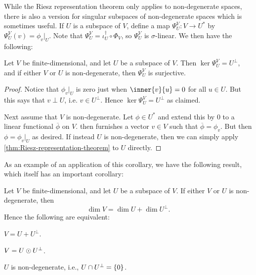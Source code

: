 While the Riesz representation theorem only applies to non-degenerate spaces, there is also a version for singular subspaces of non-degenerate spaces which is sometimes useful. If $U$ is a subspace of $V$, define a map $\Psi^V_U \colon V \to U^*$ by $\Psi^V_U(v) = \phi_v|_U$. Note that $\Psi^V_U = \iota_U^\dagger \circ \Phi_V$, so $\Psi^V_U$ is $\sigma$-linear. We then have the following:

\begin{corollary}
    \label{thm:Riesz-representation-theorem-for-subspaces}
    Let $V$ be finite-dimensional, and let $U$ be a subspace of $V$. Then $\ker \Psi^V_U = U^\perp$, and if either $V$ or $U$ is non-degenerate, then $\Psi^V_U$ is surjective.
\end{corollary}

\begin{proof}
    Notice that $\phi_v|_U$ is zero just when $\inner{v}{u} = 0$ for all $u \in U$. But this says that $v \perp U$, i.e. $v \in U^\perp$. Hence $\ker \Psi^V_U = U^\perp$ as claimed.
    
    Next assume that $V$ is non-degenerate. Let $\phi \in U^*$ and extend this by $0$ to a linear functional $\overline{\phi}$ on $V$.  then furnishes a vector $v \in V$ such that $\overline{\phi} = \phi_v$. But then $\phi = \phi_v|_U$ as desired. If instead $U$ is non-degenerate, then we can simply apply \cref{thm:Riesz-representation-theorem} to $U$ directly.
\end{proof}
%
As an example of an application of this corollary, we have the following result, which itself has an important corollary:

\begin{proposition}
    \label{prop:non-degenerate-space-decomposition}
    Let $V$ be finite-dimensional, and let $U$ be a subspace of $V$. If either $V$ or $U$ is non-degenerate, then
    \begin{equation*}
        \dim V
            = \dim U + \dim U^\perp.
    \end{equation*}
    Hence the following are equivalent:
    \begin{enumproposition}
        \item $V = U + U^\perp$.
        \item $V = U \odot U^\perp$.
        \item $U$ is non-degenerate, i.e., $U \cap U^\perp = \{0\}$.
    \end{enumproposition}
\end{proposition}


